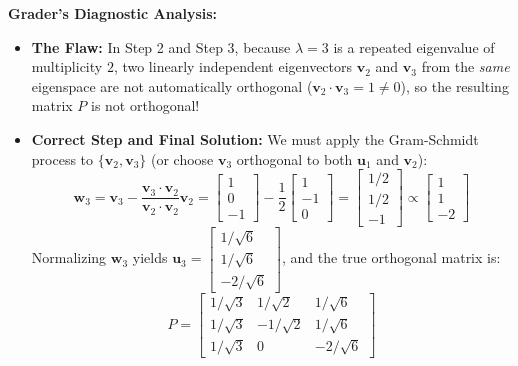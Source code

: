 \documentclass[11pt, letterpaper]{article}
\theoremstyle{definition}
\theoremstyle{remark}
\begin{document}
\textbf{Grader's Diagnostic Analysis:}
\begin{itemize}
    \item \textbf{The Flaw:} In Step 2 and Step 3, because $\lambda = 3$ is a repeated eigenvalue of multiplicity $2$, two linearly independent eigenvectors $\mathbf{v}_2$ and $\mathbf{v}_3$ from the \textit{same} eigenspace are not automatically orthogonal ($\mathbf{v}_2 \cdot \mathbf{v}_3 = 1 \neq 0$), so the resulting matrix $P$ is not orthogonal!
    \item \textbf{Correct Step and Final Solution:} We must apply the Gram-Schmidt process to $\{\mathbf{v}_2, \mathbf{v}_3\}$ (or choose $\mathbf{v}_3$ orthogonal to both $\mathbf{u}_1$ and $\mathbf{v}_2$):
    \[
    \mathbf{w}_3 = \mathbf{v}_3 - \frac{\mathbf{v}_3 \cdot \mathbf{v}_2}{\mathbf{v}_2 \cdot \mathbf{v}_2}\mathbf{v}_2 = \begin{bmatrix} 1 \\ 0 \\ -1 \end{bmatrix} - \frac{1}{2}\begin{bmatrix} 1 \\ -1 \\ 0 \end{bmatrix} = \begin{bmatrix} 1/2 \\ 1/2 \\ -1 \end{bmatrix} \propto \begin{bmatrix} 1 \\ 1 \\ -2 \end{bmatrix}
    \]
    Normalizing $\mathbf{w}_3$ yields $\mathbf{u}_3 = \begin{bmatrix} 1/\sqrt{6} \\ 1/\sqrt{6} \\ -2/\sqrt{6} \end{bmatrix}$, and the true orthogonal matrix is:
    \[
    P = \begin{bmatrix} 1/\sqrt{3} & 1/\sqrt{2} & 1/\sqrt{6} \\ 1/\sqrt{3} & -1/\sqrt{2} & 1/\sqrt{6} \\ 1/\sqrt{3} & 0 & -2/\sqrt{6} \end{bmatrix}
    \]
\end{itemize}
\end{document}
